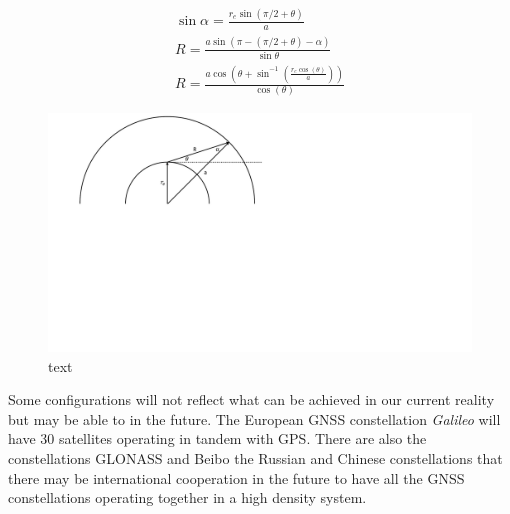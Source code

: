 \begin{eqnarray}
\sin\alpha = \frac{r_e\sin(\pi/2+\theta)}{a}\\
R = \frac{a\sin(\pi-(\pi/2+\theta)-\alpha)}{\sin\theta}\\
R = \frac{a\cos\left( \theta+\sin^{-1}\left( \frac{r_e\cos(\theta)}{a} \right) \right)}{\cos(\theta)}
\end{eqnarray}
\begin{figure}
\centering
\caption{text}
\label{fig:orbit_distance}
\includegraphics[trim={0 11cm 16cm 0},clip,width = 0.7\linewidth]{ChapterExperiments/Figures/orbit_distance}
\end{figure}

Some configurations will not reflect what can be achieved in our current reality but may be able to in the future. The European GNSS constellation \textit{Galileo} will have 30 satellites operating in tandem with GPS. There are also the constellations GLONASS and Beibo the Russian and Chinese constellations that there may be international cooperation in the future to have all the GNSS constellations operating together in a high density system.


